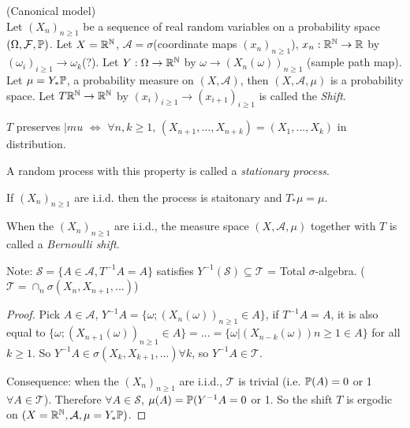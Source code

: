 \documentclass[a4paper]{article}
\begin{document}
\begin{eg} (Canonical model)\\
Let $(X_n)_{n \geq 1}$ be a sequence of real random variables on a probability space $(\Omega, \mathcal{F},\P)$. Let $X =\R^\N$, $\mathcal{A} = \sigma$(coordinate maps $(x_n)_{n \geq 1}$), $x_n: \R^\N \to \R$ by $(\omega_i)_{i \geq 1} \to \omega_k$(?). Let $Y:\Omega \to \R^\N$ by $\omega \to (X_n(\omega))_{n \geq 1}$ (sample path map). Let $\mu = Y_* \P$, a probability measure on $(X,\mathcal{A})$, then $(X,\mathcal{A},\mu)$ is a probability space. Let $T\R^\N \to \R^\N$ by $(x_i)_{i \geq 1} \to (x_{i+1})_{i \geq 1}$ is called the \emph{Shift}.
\end{eg}

\begin{rem}
$T$ preserves $|mu$ $\iff$ $\forall n,k \geq 1$, $(X_{n+1},...,X_{n+k}) = (X_1,...,X_k)$ in distribution.
\end{rem}

\begin{defi}
A random process with this property is called a \emph{stationary process}.
\end{defi}

\begin{eg}
If $(X_n)_{n \geq 1}$ are i.i.d. then the process is staitonary and $T_* \mu = \mu$.
\end{eg}

\begin{defi}
When the $(X_n)_{n \geq 1}$ are i.i.d., the measure space $(X,\mathcal{A},\mu)$ together with $T$ is called a \emph{Bernoulli shift}.
\end{defi}

Note: $\mathscr{S} =\{A \in \mathcal{A}, T^{-1} A = A\}$ satisfies $Y^{-1}(\mathscr{S}) \subseteq \mathscr{T}$ = Total $\sigma$-algebra. ($\mathscr{T} = \cap_n \sigma(X_n,X_{n+1},...)$)

\begin{proof}
Pick $A \in \mathcal{A}$, $Y^{-1} A =\{\omega; (X_n(\omega))_{n \geq 1} \in A\}$, if $T^{-1}A = A$, it is also equal to $\{\omega; (X_{n+1}(\omega))_{n \geq 1} \in A\} = ... = \{\omega | (X_{n-k} (\omega)) n \geq 1 \in A\}$ for all $k \geq 1$. So $Y^{-1} A \in \sigma(X_k,X_{k+1},...) \forall k$, so $Y^{-1}A \in \mathscr{T}$.

Consequence: when the $(X_n)_{n \geq 1}$ are i.i.d., $\mathscr{T}$ is trivial (i.e. $\P(A) = 0$ or 1 $\forall A \in \mathscr{T}$). Therefore $\forall A \in \mathscr{S}$, $\mu(A) = \P(Y^{-1}A = 0$ or 1. So the shift $T$ is ergodic on $(X=\R^\N,\mathcal{A},\mu = Y_*\P)$.
\end{proof}
\end{document}
